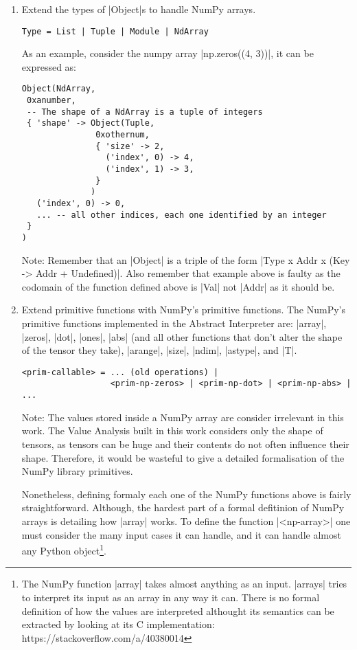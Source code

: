 \begin{enumerate}
\def\labelenumi{\arabic{enumi}.}
\item
  Extend the types of \pycode|Object|s to handle NumPy arrays.

\begin{verbatim}
Type = List | Tuple | Module | NdArray
\end{verbatim}

  As an example, consider the numpy array \pycode|np.zeros((4, 3))|, it
  can be expressed as:

\begin{verbatim}
Object(NdArray,
 0xanumber,
 -- The shape of a NdArray is a tuple of integers
 { 'shape' -> Object(Tuple,
               0xothernum,
               { 'size' -> 2,
                 ('index', 0) -> 4,
                 ('index', 1) -> 3,
               }
              )
   ('index', 0) -> 0,
   ... -- all other indices, each one identified by an integer
 }
)
\end{verbatim}

  Note: Remember that an \pycode|Object| is a triple of the form
  \pycode|Type x Addr x (Key -> Addr + Undefined)|.
  Also remember that example above is faulty as the codomain of the
  function defined above is \pycode|Val| not \pycode|Addr| as it should
  be.
\item
  Extend primitive functions with NumPy's primitive functions. The
  NumPy's primitive functions implemented in the Abstract Interpreter
  are: \pycode|array|, \pycode|zeros|, \pycode|dot|, \pycode|ones|,
  \pycode|abs| (and all other functions that don't alter the shape of
  the tensor they take), \pycode|arange|, \pycode|size|, \pycode|ndim|,
  \pycode|astype|, and \pycode|T|.

\begin{verbatim}
<prim-callable> = ... (old operations) |
                  <prim-np-zeros> | <prim-np-dot> | <prim-np-abs> | ...
\end{verbatim}

  Note: The values stored inside a NumPy array are consider irrelevant
  in this work. The Value Analysis built in this work considers only the
  shape of tensors, as tensors can be huge and their contents do not
  often influence their shape. Therefore, it would be wasteful to give a
  detailed formalisation of the NumPy library primitives.

  Nonetheless, defining formaly each one of the NumPy functions above is
  fairly straightforward. Although, the hardest part of a formal
  defitinion of NumPy arrays is detailing how \pycode|array| works. To
  define the function \pycode|<np-array>| one
  must consider the many input cases it can handle, and it can handle
  almost any Python object\footnote{The NumPy function \pycode|array|
    takes almost anything as an input. \pycode|arrays| tries to
    interpret its input as an array in any way it can. There is no
    formal definition of how the values are interpreted althought its
    semantics can be extracted by looking at its C implementation:
    https://stackoverflow.com/a/40380014}.


\end{enumerate}
